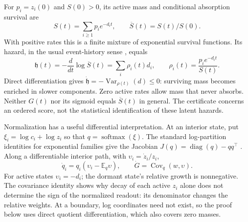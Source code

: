 For $p_i=z_i(0)$ and $S(0)>0$, its active mass and conditional absorption survival are
\begin{equation}\label{eq:active-survival}
S(t)=\sum_{i\ge1}p_i e^{-d_it},\qquad
\overline S(t)=S(t)/S(0).
\end{equation}
With positive rates this is a finite mixture of exponential survival functions. Its hazard, in the usual event-history sense \cite{aalen}, equals
\begin{equation}\label{eq:mixture-hazard}
\mathfrak h(t)=-\frac{d}{dt}\log\overline S(t)
=\sum_i\rho_i(t)d_i,\qquad
\rho_i(t)=\frac{p_i e^{-d_it}}{S(t)}.
\end{equation}
Direct differentiation gives $\dot{\mathfrak h}=-\operatorname{Var}_{\rho(t)}(d)\le0$: surviving mass becomes enriched in slower components. Zero active rates allow mass that never absorbs. Neither $G(t)$ nor its sigmoid equals $\overline S(t)$ in general. The certificate concerns an ordered score, not the statistical identification of these latent hazards.

Normalization has a useful differential interpretation. At an interior state, put $\xi_i=\log c_i+\log z_i$ so that $q=\operatorname{softmax}(\xi)$. The standard log-partition identities for exponential families give the Jacobian $J(q)=\operatorname{diag}(q)-qq^\top$ \cite{exponential}. Along a differentiable interior path, with $\upsilon_i=\dot z_i/z_i$,
\begin{equation}\label{eq:covariance}
\dot q_i=q_i(\upsilon_i-\mathbb E_q\upsilon),\qquad
\dot G=\operatorname{Cov}_q(w,\upsilon).
\end{equation}
For active states $\upsilon_i=-d_i$; the dormant state's relative growth is nonnegative. The covariance identity shows why decay of each active $z_i$ alone does not determine the sign of the normalized readout: its denominator changes the relative weights. At a boundary, log coordinates need not exist, so the proof below uses direct quotient differentiation, which also covers zero masses.

